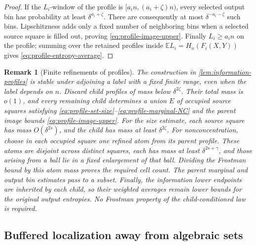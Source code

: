 \documentclass[11pt]{article}
\newtheorem{remark}[theorem]{Remark}
\begin{document}
\begin{proof}
If the \(L_i\)-window of the profile is
\([a_i n,(a_i+\zeta)n)\), every selected output bin has probability
at least \(\delta^{a_i+\zeta}\).  There are consequently at most
\(\delta^{-a_i-\zeta}\) such bins.  Lipschitzness adds only a fixed
number of neighboring bins when a selected source square is filled
out, proving \eqref{eq:profile-image-upper}.  Finally
\(L_i\ge a_i n\) on the profile; summing over the retained profiles
inside \(\mathbb E L_i=H_n(F_i(X,Y))\) gives
\eqref{eq:profile-entropy-average}.
\end{proof}

\begin{remark}[Finite refinements of profiles]
\label{rem:profile-refinement}
The construction in \cref{lem:information-profiles} is stable under
adjoining a label with a fixed finite range, even when the label
depends on \(n\).  Discard child profiles of mass below
\(\delta^{2\zeta}\).  Their total mass is \(o(1)\), and every
remaining child determines a union \(E\) of occupied source squares
satisfying \eqref{eq:profile-set-size}--\eqref{eq:profile-marginal-NC}
and the parent image bounds \eqref{eq:profile-image-upper}.
For the size estimate, each source square has mass
\(O(\delta^{2s})\), and the child has mass at least
\(\delta^{2\zeta}\).  For nonconcentration, choose in each occupied
square one refined atom from its parent profile.  These atoms are
disjoint across distinct squares, each has mass at least
\(\delta^{2s+\gamma}\), and those arising from a ball lie in a fixed
enlargement of that ball.  Dividing the Frostman bound by this atom
mass proves the required cell count.  The parent marginal and output
bin estimates pass to a subset.  Finally, the information lower
endpoints are inherited by each child, so their weighted averages
remain lower bounds for the original output entropies.  No Frostman
property of the child-conditioned law is required.
\end{remark}

\subsection{Buffered localization away from algebraic sets}
\end{document}
